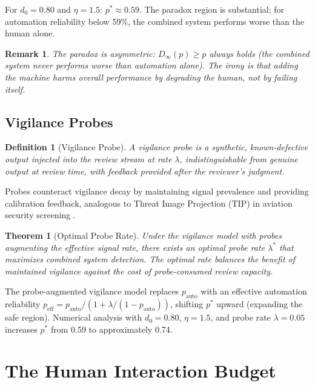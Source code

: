 \documentclass[11pt, a4paper, copyright]{googledeepmind}
\newtheorem{definition}{Definition}[section]
\newtheorem{theorem}{Theorem}[section]
\newtheorem*{remark}{Remark}
\begin{document}
For $d_0 = 0.80$ and $\eta = 1.5$: $p^* \approx 0.59$. The paradox region is substantial; for automation reliability below 59\%, the combined system performs worse than the human alone.

\begin{remark}
The paradox is asymmetric: $D_\infty(p) \geq p$ always holds (the combined system never performs worse than automation alone). The irony is that adding the machine harms overall performance by degrading the human, not by failing itself.
\end{remark}

\subsection{Vigilance Probes}

\begin{definition}[Vigilance Probe]
A vigilance probe is a synthetic, known-defective output injected into the review stream at rate $\lambda$, indistinguishable from genuine output at review time, with feedback provided after the reviewer's judgment.
\end{definition}

Probes counteract vigilance decay by maintaining signal prevalence and providing calibration feedback, analogous to Threat Image Projection (TIP) in aviation security screening \citep{wolfe2005low}.

\begin{theorem}[Optimal Probe Rate]
\label{thm:probe-rate}
Under the vigilance model with probes augmenting the effective signal rate, there exists an optimal probe rate $\lambda^*$ that maximizes combined system detection. The optimal rate balances the benefit of maintained vigilance against the cost of probe-consumed review capacity.
\end{theorem}

The probe-augmented vigilance model replaces $p_{\text{auto}}$ with an effective automation reliability $p_{\text{eff}} = p_{\text{auto}} / (1 + \lambda/(1-p_{\text{auto}}))$, shifting $p^*$ upward (expanding the safe region). Numerical analysis with $d_0 = 0.80$, $\eta = 1.5$, and probe rate $\lambda = 0.05$ increases $p^*$ from 0.59 to approximately 0.74.

\section{The Human Interaction Budget}
\label{sec:budget}
\end{document}
